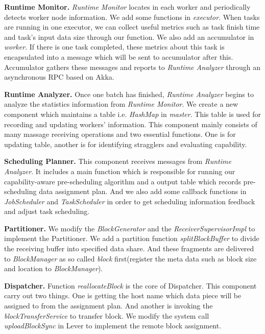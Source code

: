   \textbf{Runtime Monitor.} \emph{Runtime Monitor} locates in each worker and periodically detects worker node information. We add some functions in \emph{executor}. When tasks are running in one executor, we can collect useful metrics such as task finish time and task's input data size through our function. We also add an accumulator in \emph{worker}. If there is one task completed, these metrics about this task is encapsulated into a message which will be sent to accumulator after this. Accumulator gathers these messages and reports to \emph{Runtime Analyzer} through an asynchronous RPC based on Akka.

  \textbf{Runtime Analyzer.} Once one batch has finished, \emph{Runtime Analyzer} begins to analyze the statistics information from \emph{Runtime Monitor}. We create a new component which maintains a table i.e. \emph{HashMap} in \emph{master}. This table is used for recording and updating workers' information. This component mainly consists of many massage receiving operations and two essential functions. One is for updating table, another is for identifying stragglers and evaluating capability.

  \textbf{Scheduling Planner.} This component receives messages from \emph{Runtime Analyzer}. It includes a main function which is responsible for running our capability-aware pre-scheduling algorithm and a output table which records pre-scheduling data assignment plan. And we also add some callback functions in \emph{JobScheduler} and \emph{TaskScheduler} in order to get scheduling information feedback and adjust task scheduling.

  \textbf{Partitioner.} We modify the \emph{BlockGenerator} and the \emph{ReceiverSupervisorImpl} to implement the Partitioner. We add a partition function \emph{splitBlockBuffer} to divide the receiving buffer into specified data share. And these fragments are delivered to \emph{BlockManager} as so called \emph{block} first(register the meta data such as block size and location to \emph{BlockManager}).

  \textbf{Dispatcher.} Function \emph{reallocateBlock} is the core of Dispatcher. This component carry out two things. One is getting the host name which data piece will be assigned to from the assignment plan. And another is invoking the \emph{blockTransferService} to transfer block. We modify the system call \emph{uploadBlockSync} in Lever to implement the remote block assignment.
